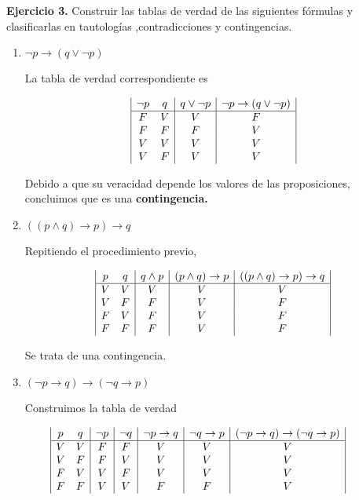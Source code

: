 \textbf{Ejercicio 3.} Construir las tablas de verdad de las siguientes fórmulas y clasificarlas en tautologías ,contradicciones y
contingencias.

\begin{enumerate}
	\item $\neg p \rightarrow (q \vee \neg p)$
	
	La tabla de verdad correspondiente es
	
	\begin{displaymath}
		\begin{array}{|c c|c|c|}
			\neg p & q & q \vee \neg p & \neg p \rightarrow (q \vee \neg p)\\
			\hline 
			F & V & V & F\\
			F & F & F & V\\
			V & V & V & V\\
			V & F & V & V\\
		\end{array}
	\end{displaymath}
	
	Debido a que su veracidad depende los valores de las proposiciones, concluimos que es una \textbf{contingencia.}
	
	\item $((p \wedge q) \rightarrow p) \rightarrow q$
	
	Repitiendo el procedimiento previo,
	
	\begin{displaymath}
		\begin{array}{|c c|c|c|c|}
			p & q & q \wedge p & (p \wedge q) \rightarrow p & ((p \wedge q) \rightarrow p) \rightarrow q \\
			\hline 
			V & V & V & V & V\\
			V & F & F & V & F\\
			F & V & F & V & F\\
			F & F & F & V & F\\
		\end{array}
	\end{displaymath}

	Se trata de una contingencia.
	
	\item $(\neg p \rightarrow q) \rightarrow (\neg q \rightarrow p)$
	
	Construimos la tabla de verdad
	
	\begin{displaymath}
		\hspace*{-1cm}
		\begin{array}{|c c|c|c|c|c|c|}
			p & q & \neg p & \neg q & \neg p \rightarrow q & \neg q \rightarrow p & (\neg p \rightarrow q) \rightarrow (\neg q \rightarrow p) \\
			\hline 
			V & V & F & F & V & V & V\\
			V & F & F & V & V & V & V\\
			F & V & V & F & V & V & V\\
			F & F & V & V & F & F & V\\
		\end{array}
	\end{displaymath}
	

\end{enumerate}
